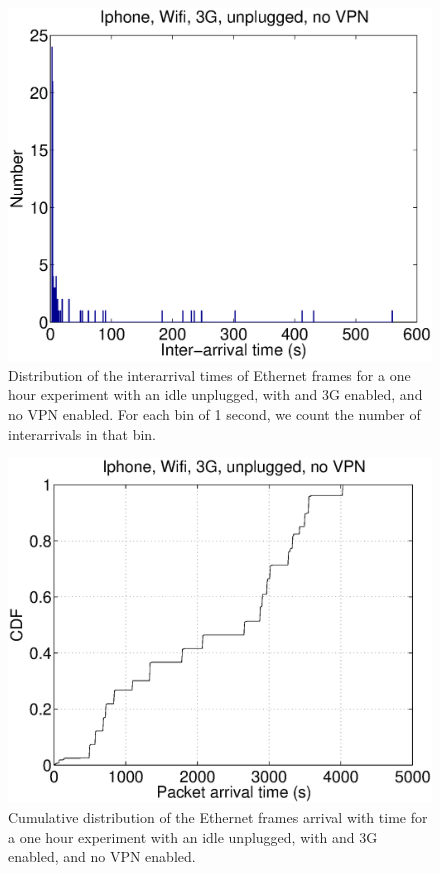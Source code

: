 \begin{figure}
\centering
        \includegraphics[width=0.8\linewidth]{../../code/pushNotification/Fig/bw_iphone_wifi_3g_unplug_novpn_interTs.eps}
  \caption{Distribution of the interarrival times of Ethernet frames
    for a one hour experiment with an idle \iphone{} unplugged, with \wifi{} and 3G
    enabled, and no VPN enabled. For each bin of 1 second, we count
    the number of interarrivals in that bin.}
  \label{fig:push_w3_interTs}
\end{figure}

\begin{figure}
\centering
        \includegraphics[width=0.8\linewidth]{../../code/pushNotification/Fig/bw_iphone_wifi_3g_unplug_novpn_ts.eps}
  \caption{Cumulative distribution of the Ethernet frames
          arrival with time for a one hour experiment with an idle
          \iphone{} unplugged, with \wifi{} and 3G enabled, and no VPN
          enabled.}
  \label{fig:push_w3_ts}
\end{figure}

